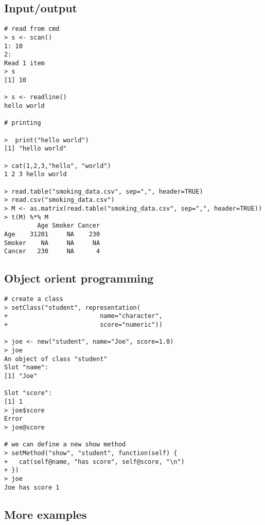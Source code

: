 \documentclass{article}[11pt]
\begin{document}
\subsection*{Input/output}

\begin{verbatim}
# read from cmd
> s <- scan()
1: 10
2: 
Read 1 item
> s
[1] 10

> s <- readline()
hello world

# printing

>  print("hello world")
[1] "hello world"

> cat(1,2,3,"hello", "world")
1 2 3 hello world

> read.table("smoking_data.csv", sep=",", header=TRUE)
> read.csv("smoking_data.csv")
> M <- as.matrix(read.table("smoking_data.csv", sep=",", header=TRUE))
> t(M) %*% M
         Age Smoker Cancer
Age    31201     NA    230
Smoker    NA     NA     NA
Cancer   230     NA      4
\end{verbatim}

\subsection*{Object orient programming}


\begin{verbatim}
# create a class
> setClass("student", representation(
+                         name="character", 
+                         score="numeric"))

> joe <- new("student", name="Joe", score=1.0)
> joe
An object of class "student"
Slot "name":
[1] "Joe"

Slot "score":
[1] 1
> joe$score 
Error
> joe@score

# we can define a new show method
> setMethod("show", "student", function(self) {
+   cat(self@name, "has score", self@score, "\n")
+ })
> joe
Joe has score 1
\end{verbatim}


\subsection*{More examples}
\end{document}
